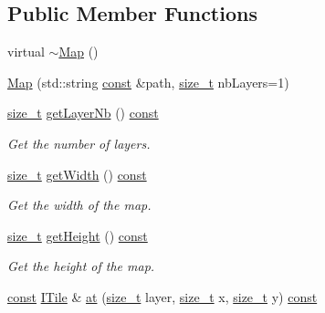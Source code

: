 \subsection*{Public Member Functions}
\begin{DoxyCompactItemize}
\item 
virtual \hyperlink{classarcade_1_1_map_a3d7b4b20f74d90a75aa6a5398dd28ee5}{$\sim$\-Map} ()
\item 
\hyperlink{classarcade_1_1_map_a5ca6eb4bfac7e73267b4cced9901be24}{Map} (std\-::string \hyperlink{term__entry_8h_a57bd63ce7f9a353488880e3de6692d5a}{const} \&path, \hyperlink{nc__alloc_8h_a7b60c5629e55e8ec87a4547dd4abced4}{size\-\_\-t} nb\-Layers=1)
\item 
\hyperlink{nc__alloc_8h_a7b60c5629e55e8ec87a4547dd4abced4}{size\-\_\-t} \hyperlink{classarcade_1_1_map_a208c3c498f82871a844cc0bb8e29f8eb}{get\-Layer\-Nb} () \hyperlink{term__entry_8h_a57bd63ce7f9a353488880e3de6692d5a}{const} 
\begin{DoxyCompactList}\small\item\em Get the number of layers. \end{DoxyCompactList}\item 
\hyperlink{nc__alloc_8h_a7b60c5629e55e8ec87a4547dd4abced4}{size\-\_\-t} \hyperlink{classarcade_1_1_map_a55d2afd98fcc471f5075a99357673700}{get\-Width} () \hyperlink{term__entry_8h_a57bd63ce7f9a353488880e3de6692d5a}{const} 
\begin{DoxyCompactList}\small\item\em Get the width of the map. \end{DoxyCompactList}\item 
\hyperlink{nc__alloc_8h_a7b60c5629e55e8ec87a4547dd4abced4}{size\-\_\-t} \hyperlink{classarcade_1_1_map_a0ff5ecb8be07f6e121665200d636ac40}{get\-Height} () \hyperlink{term__entry_8h_a57bd63ce7f9a353488880e3de6692d5a}{const} 
\begin{DoxyCompactList}\small\item\em Get the height of the map. \end{DoxyCompactList}\item 
\hyperlink{term__entry_8h_a57bd63ce7f9a353488880e3de6692d5a}{const} \hyperlink{classarcade_1_1_i_tile}{I\-Tile} \& \hyperlink{classarcade_1_1_map_a999ff5376aff11492828167cab3de5bd}{at} (\hyperlink{nc__alloc_8h_a7b60c5629e55e8ec87a4547dd4abced4}{size\-\_\-t} layer, \hyperlink{nc__alloc_8h_a7b60c5629e55e8ec87a4547dd4abced4}{size\-\_\-t} x, \hyperlink{nc__alloc_8h_a7b60c5629e55e8ec87a4547dd4abced4}{size\-\_\-t} y) \hyperlink{term__entry_8h_a57bd63ce7f9a353488880e3de6692d5a}{const} 

\end{DoxyCompactItemize}
